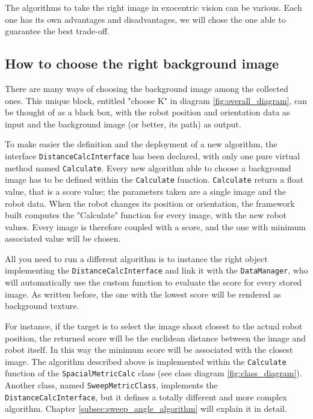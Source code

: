 %
The algorithms to take the right image in exocentric vision can be various. Each one has its own
advantages and disadvantages, we will chose the one able to guarantee the best trade-off.

\subsection{How to choose the right background image}
There are many ways of choosing the background image among the collected ones. This unique
block, entitled "choose K" in diagram \ref{fig:overall_diagram}, can be thought of as a
black box, with the robot position and orientation data as input and the background image
(or better, its path) as output.
%

%
To make easier the definition and the deployment of a new algorithm, the interface
\texttt{DistanceCalcInterface} has been declared, with only one pure virtual method named
\texttt{Calculate}. Every new algorithm able to choose a background image has to be defined
within the \texttt{Calculate} function.
\texttt{Calculate} return a float value, that is a score value; the parameters taken are a
single image and the robot data. When the robot changes its position or orientation, the
framework built computes the "Calculate" function for every image, with the new robot values.
Every image is therefore coupled with a score, and the one with minimum associated value will
be chosen.
%

%
All you need to run a different algorithm is to instance the right object implementing the
\texttt{DistanceCalcInterface} and link it with the \texttt{DataManager}, who will automatically
use the custom function to evaluate the score for every stored image. As written before, the
one with the lowest score will be rendered as background texture.
%

%
For instance, if the target is to select the image shoot closest to the actual robot position,
the returned score will be the euclidean distance between the image and robot itself. In this way
the minimum score will be associated with the closest image.
The algorithm described above is implemented within the \texttt{Calculate} function of the
\texttt{SpacialMetricCalc} class (see class diagram \ref{fig:class_diagram}). Another class, named
\texttt{SweepMetricClass}, implements the \texttt{DistanceCalcInterface}, but it defines a totally
different and more complex algorithm. Chapter \ref{subsec:sweep_angle_algorithm} will explain
it in detail.

